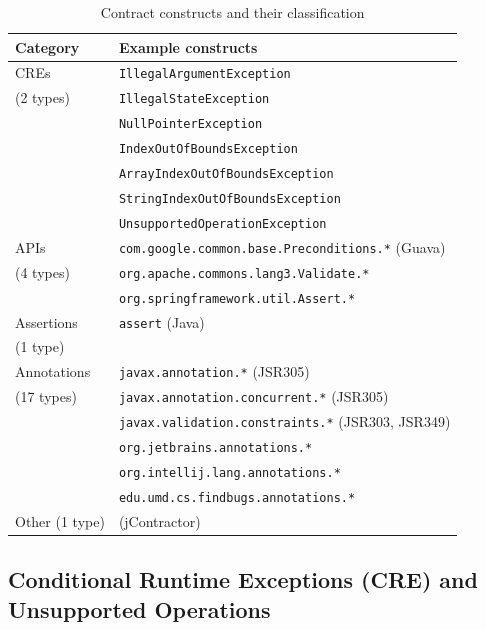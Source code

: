 \documentclass[a4paper,UKenglish]{lipics-v2016}
\begin{document}
\begin{table}
	\caption{Contract constructs and their classification}
	\label{tab:implicit_contracts}
	\begin{tabular}{|p{2cm}|p{10cm}|}
		\hline
		Category & Example constructs\\
		\hline
		CREs & \texttt{IllegalArgumentException}\\
		(2 types) &  \texttt{IllegalStateException}\\
		&  \texttt{NullPointerException}\\
		&  \texttt{IndexOutOfBoundsException}\\
		&  \texttt{ArrayIndexOutOfBoundsException}\\
		&  \texttt{StringIndexOutOfBoundsException}\\
		&  \texttt{UnsupportedOperationException}\\ \hline
		
		APIs & \texttt{com.google.common.base.Pre\-conditions.*} (Guava)\\
		(4 types) &     \texttt{org.apache.commons.lang3.Validate.*} \\
		&     \texttt{org.springframework.util.Assert.*}\\
		
		\hline
		
		Assertions & \texttt{assert} (Java)\\
		(1 type) &  \ \\
		
		\hline
		
		Annotations & \texttt{javax.annotation.*} (JSR305)\\
		(17 types) &  \texttt{javax.annotation.concurrent.*} (JSR305)\\
		&  \texttt{javax.validation.constraints.*} (JSR303, JSR349)\\
		&  \texttt{org.jetbrains.annotations.*}\\
		&  \texttt{org.intellij.lang.annotations.*}\\
		&  \texttt{edu.umd.cs.findbugs.annotations.*}\\
		
		\hline 
		
		Other (1 type) & (jContractor)\\
		
		\hline
		
	\end{tabular}
\end{table}


\subsection{Conditional Runtime Exceptions (CRE) and Unsupported Operations}
\end{document}
